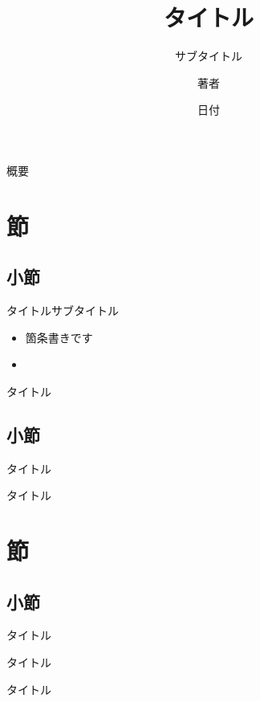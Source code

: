 \documentclass[17pt,dvipdfm]{beamer}%
\title{タイトル}
\subtitle{サブタイトル}
\author{著者}
\institute{所属}
\date{日付}
\begin{document}
\begin{frame}
\titlepage
\end{frame}

\begin{frame}{概要}
\tableofcontents
\end{frame}

\section{節}

\subsection{小節}

\begin{frame}{タイトル}{サブタイトル}

\begin{itemize}
\item
箇条書きです

\item

\end{itemize}

\end{frame}

\begin{frame}{タイトル}
\end{frame}


\subsection{小節}

\begin{frame}{タイトル}
\end{frame}

\begin{frame}{タイトル}
\end{frame}


\section{節}

\subsection{小節}

\begin{frame}{タイトル}
\end{frame}

\begin{frame}{タイトル}
\end{frame}

\begin{frame}{タイトル}
\end{frame}
\end{document}
